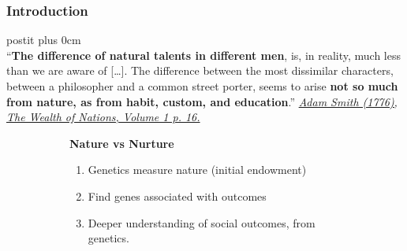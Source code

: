 \documentclass[dvipsnames,handout]{beamer} %
\renewcommand{\raggedright}{\leftskip=0pt \rightskip=0pt plus 0cm}
\begin{document}
\begin{frame}[noframenumbering]
    \frametitle{Introduction}
    \begin{beamercolorbox}{postit}
        \raggedright
        \vspace{0.01cm} \\
        ``\textbf{The difference of natural talents in different men}, is, in reality, much less than we are aware of [\ldots].
        The difference between the most dissimilar characters, between a philosopher and a common street porter, seems to arise \textbf{not so much from nature, as from habit, custom, and education}.''
        \hfill
        \underline{\textit{Adam Smith (1776), The Wealth of Nations, Volume 1 p. 16.}}
        \vspace{0.02cm}
    \end{beamercolorbox}
    \vspace{-0.25cm}
    \begin{figure}[h!]
        \centering
        \singlespacing
        \begin{subfigure}[c]{0.5\textwidth}
            \centering
        \end{subfigure}
        \hfill
        \begin{subfigure}[c]{0.45\textwidth}
            \textbf{Nature vs Nurture}
            \begin{enumerate}
                \item Genetics measure nature (initial endowment)
                \item Find genes associated with outcomes
                \item Deeper understanding of social outcomes, from genetics.
            \end{enumerate}
        \end{subfigure}
    \end{figure}
\end{frame}
\end{document}
